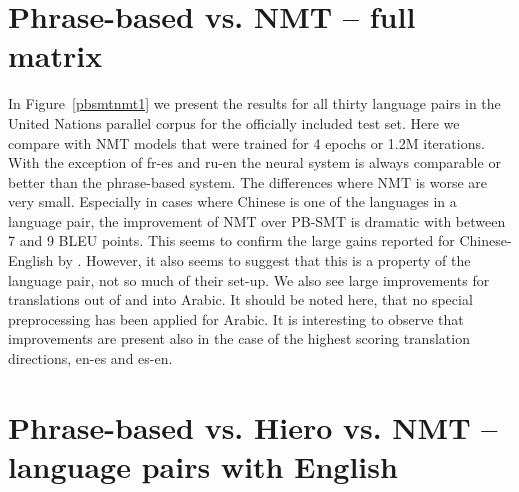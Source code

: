 \documentclass[11pt]{article}
\begin{document}

\section{Phrase-based vs. NMT -- full matrix}
In Figure~\ref{pbsmtnmt1} we present the results for all thirty language pairs in the United Nations parallel corpus for the officially included test set. Here we compare with NMT models that were trained for 4 epochs or 1.2M iterations. With the exception of fr-es and ru-en the neural system is always comparable or better than the phrase-based system. The differences where NMT is worse are very small. Especially in cases where Chinese is one of the languages in a language pair, the improvement of NMT over PB-SMT is dramatic with between 7 and 9 BLEU points. This seems to confirm the large gains reported for Chinese-English by . However, it also seems to suggest that this is a property of the language pair, not so much of their set-up. We also see large improvements for translations out of and into Arabic. It should be noted here, that no special preprocessing has been applied for Arabic. It is interesting to observe that improvements are present also in the case of the highest scoring translation directions, en-es and es-en.

\section{Phrase-based vs. Hiero vs. NMT -- language pairs with English}
\end{document}
